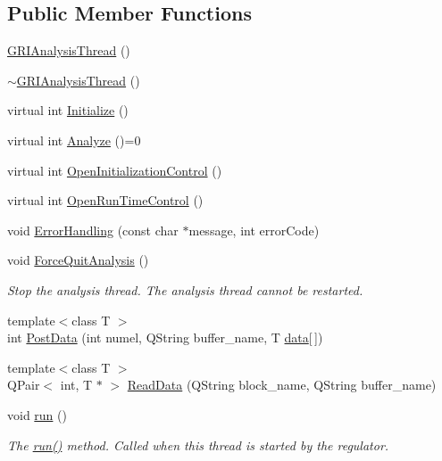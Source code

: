 \subsection*{\-Public \-Member \-Functions}
\begin{DoxyCompactItemize}
\item 
\hyperlink{classGRIAnalysisThread_ada9e9b19152dcaee0450d714950fdf4d}{\-G\-R\-I\-Analysis\-Thread} ()
\item 
\hyperlink{classGRIAnalysisThread_a2445ebf95f8be49e424e80ea4995c2b2}{$\sim$\-G\-R\-I\-Analysis\-Thread} ()
\item 
virtual int \hyperlink{classGRIAnalysisThread_a54f456a691dd224c3fa9d218893f0450}{\-Initialize} ()
\item 
virtual int \hyperlink{classGRIAnalysisThread_ab79e42bdef4dff323a979f6376359e83}{\-Analyze} ()=0
\item 
virtual int \hyperlink{classGRIAnalysisThread_a2f1eb919824b1e84839bacd95c20d28b}{\-Open\-Initialization\-Control} ()
\item 
virtual int \hyperlink{classGRIAnalysisThread_a8a6e9addc9af1ace45214043cf303fba}{\-Open\-Run\-Time\-Control} ()
\item 
void \hyperlink{classGRIAnalysisThread_ac36ec4cf19c888806e32705038545333}{\-Error\-Handling} (const char $\ast$message, int error\-Code)
\item 
void \hyperlink{classGRIAnalysisThread_af6445053a1461b3a71b214bc0cfd42bb}{\-Force\-Quit\-Analysis} ()
\begin{DoxyCompactList}\small\item\em \-Stop the analysis thread. \-The analysis thread cannot be restarted. \end{DoxyCompactList}\item 
{\footnotesize template$<$class T $>$ }\\int \hyperlink{classGRIAnalysisThread_ab6d676094d4fc86384a4565e9e5a756b}{\-Post\-Data} (int numel, \-Q\-String buffer\-\_\-name, \-T \hyperlink{structGRIProcessThread_1_1data}{data}\mbox{[}$\,$\mbox{]})
\item 
{\footnotesize template$<$class T $>$ }\\\-Q\-Pair$<$ int, \-T $\ast$ $>$ \hyperlink{classGRIAnalysisThread_a38377b7fa474a30b65973d6d5150ef46}{\-Read\-Data} (\-Q\-String block\-\_\-name, \-Q\-String buffer\-\_\-name)
\item 
void \hyperlink{classGRIAnalysisThread_acc07ee77c102f8bac877efe9938d4586}{run} ()
\begin{DoxyCompactList}\small\item\em \-The \hyperlink{classGRIAnalysisThread_acc07ee77c102f8bac877efe9938d4586}{run()} method. \-Called when this thread is started by the regulator. \end{DoxyCompactList}\item 

\end{DoxyCompactItemize}
